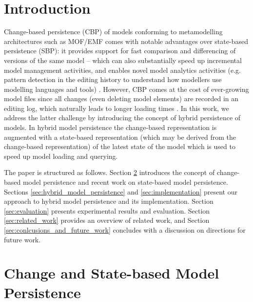 \documentclass{llncs}
\begin{document}
\vspace{-20pt}
\section{Introduction}
\label{sec:introduction}

\vspace{-10pt}
Change-based persistence (CBP) of models \cite{DBLP:conf/models/YohannisKP17} conforming to metamodelling architectures such as MOF/EMF \cite{omg2018mof,steinberg2008emf} comes with notable advantages over state-based persistence (SBP): it provides support for fast comparison and differencing of versions of the same model \cite{DBLP:conf/sde/LippeO92,DBLP:conf/caise/IgnatN05,DBLP:conf/edoc/KoegelHLHD10,koegel2010emfstore} -- which can also substantially speed up incremental model management activities, and enables novel model analytics activities (e.g. pattern detection in the editing history to understand how modellers use modelling languages and tools) \cite{DBLP:journals/entcs/RobbesL07}. However, CBP comes at the cost of ever-growing model files \cite{DBLP:conf/edoc/KoegelHLHD10,DBLP:journals/entcs/RobbesL07} since all changes (even deleting model elements) are recorded in an editing log, which naturally leads to longer loading times \cite{mens2002state}. In this work, we address the latter challenge by introducing the concept of hybrid persistence of models. In hybrid model persistence the change-based representation is augmented with a state-based representation (which may be derived from the change-based representation) of the latest state of the model which is used to speed up model loading and querying.

The paper is structured as follows. Section \ref{sec:change_and_state_based_model_persistence} introduces the concept of change-based model persistence and recent work on state-based model persistence. Sections \ref{sec:hybrid_model_persistence} and \ref{sec:implementation} present our approach to hybrid model persistence and its implementation. Section \ref{sec:evaluation} presents experimental results and evaluation. Section \ref{sec:related_work} provides an overview of related work, and Section \ref{sec:conlcusions_and_future_work} concludes with a discussion on directions for future work.

\vspace{-20pt}
\section{Change and State-based Model Persistence}
\label{sec:change_and_state_based_model_persistence}
\end{document}

